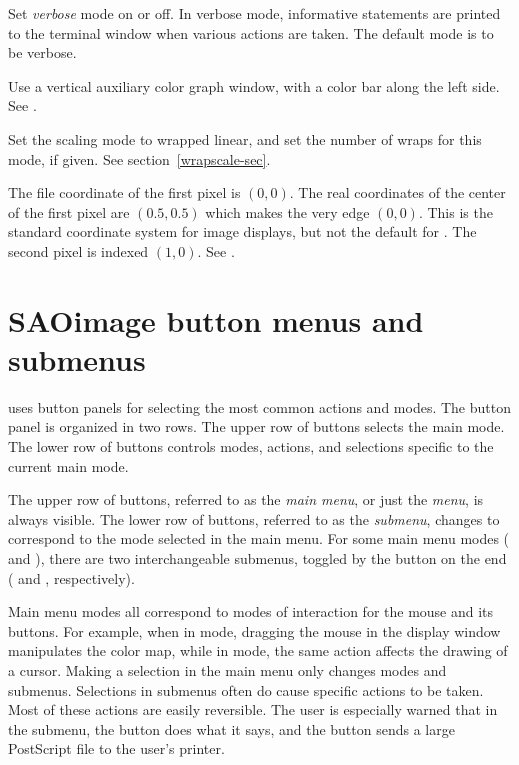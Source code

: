 \begin{description}

Set {\em verbose} mode on or off.  In verbose mode,
informative statements are
printed to the terminal window when various actions are taken.
The default mode is to be verbose.


Use a vertical auxiliary color graph window, with a color bar
along the left side.  See .


Set the scaling mode to wrapped linear, and set the number of
wraps for this mode, if given.  See section~\ref{wrapscale-sec}.


The file coordinate of the first pixel is $(0,0)$.  The real coordinates
of the center of the first pixel are $(0.5,0.5)$ which makes the
very edge $(0,0)$.  This is the standard coordinate system for image
displays, but not the default for \SAO.  The second pixel is
indexed $(1,0)$.  See .

\end{description}

\section{ SAOimage button menus and submenus } \label{btn-sec}

{\SAO} uses button panels for selecting the most common actions
and modes.  The button panel is organized in two rows.  The upper
row of buttons selects the main mode.  The lower row of buttons
controls modes, actions, and selections specific to the current
main mode.

The upper row of buttons, referred to as the {\em main menu}, or just
the {\em menu}, is always visible.  The lower row of buttons, referred
to as the {\em submenu}, changes to correspond to the mode selected in
the main menu.  For some main menu modes ( and ),
there are two interchangeable submenus, toggled by the button on the end
( and , respectively).

Main menu modes all correspond to modes of interaction for the mouse
and its buttons.  For example, when in  mode, dragging the mouse
in the display window manipulates the color map, while in  mode,
the same action affects the drawing of a cursor.  Making a selection
in the main menu only changes modes and submenus.  Selections in
submenus often do cause specific actions to be taken.  Most of these
actions are easily reversible.  The user is especially warned that in
the  submenu, the  button does what it says, and the
 button sends a large PostScript file to the user's printer.

